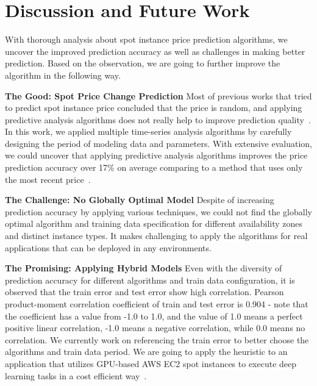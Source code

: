\documentclass[graybox]{svmult}
\begin{document}
\section{Discussion and Future Work}
With thorough analysis about spot instance price prediction algorithms, we uncover the improved prediction accuracy as well as challenges in making better prediction. Based on the observation, we are going to further improve the algorithm in the following way.  

\textbf{The Good: Spot Price Change Prediction} Most of previous works that tried to predict spot instance price concluded that the price is random, and applying predictive analysis algorithms does not really help to improve prediction quality~\cite{spot-instance-pricing-analysis,spot-price-han-arima}. In this work, we applied multiple time-series analysis algorithms by carefully designing the period of modeling data and parameters. With extensive evaluation, we could uncover that applying predictive analysis algorithms improves the price prediction accuracy over 17\% on average comparing to a method that uses only the most recent price~\cite{deep-spot-cloud,not-bid-cloud}.

\textbf{The Challenge: No Globally Optimal Model} Despite of increasing prediction accuracy by applying various techniques, we could not find the globally optimal algorithm and training data specification for different availability zones and distinct instance types. It makes challenging to apply the algorithms for real applications that can be deployed in any environments. 

\textbf{The Promising: Applying Hybrid Models} Even with the diversity of prediction accuracy for different algorithms and train data configuration, it is observed that the train error and test error show high correlation. Pearson product-moment correlation coefficient of train and test error is 0.904 - note that the coefficient has a value from -1.0 to 1.0, and the value of 1.0 means a perfect positive linear correlation, -1.0 means a negative correlation, while 0.0 means no correlation. We currently work on referencing the train error to better choose the algorithms and train data period. We are going to apply the heuristic to an application that utilizes GPU-based AWS EC2 spot instances to execute deep learning tasks in a cost efficient way~\cite{deep-spot-cloud}. 
\end{document}
